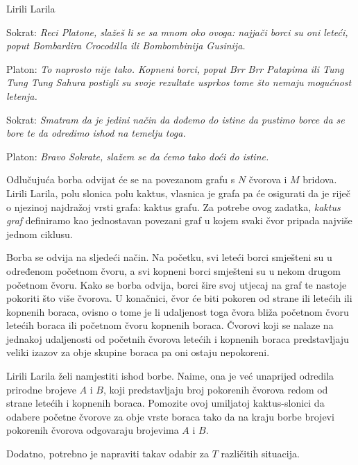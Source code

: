 \begin{statement}[
  problempoints=100,
  timelimit=3 sekunde,
  memorylimit=512 MiB,
]{Lirili Larila}

Sokrat: 
\textit{Reci Platone, slažeš li se sa mnom oko ovoga: 
najjači borci su oni leteći, poput Bombardira Crocodilla ili Bombombinija Gusinija.}

Platon:
\textit{To naprosto nije tako. Kopneni borci, poput Brr Brr Patapima ili Tung Tung Tung Sahura 
postigli su svoje rezultate usprkos tome što nemaju mogućnost letenja. }

Sokrat:
\textit{Smatram da je jedini način da dođemo do istine da pustimo borce da se bore te 
da odredimo ishod na temelju toga. }

Platon: 
\textit{Bravo Sokrate, slažem se da ćemo tako doći do istine. }

Odlučujuća borba odvijat će se na povezanom grafu s $N$ čvorova i $M$ bridova. 
Lirili Larila, polu slonica polu kaktus, vlasnica je grafa pa će osigurati 
da je riječ o njezinoj najdražoj vrsti grafa: kaktus grafu. 
Za potrebe ovog zadatka, \textit{kaktus graf} definiramo kao jednostavan povezani graf 
u kojem svaki čvor pripada najviše jednom ciklusu. 

Borba se odvija na sljedeći način. 
Na početku, svi leteći borci smješteni su u određenom početnom čvoru, a svi kopneni 
borci smješteni su u nekom drugom početnom čvoru. 
Kako se borba odvija, borci šire svoj utjecaj na graf te nastoje pokoriti što više čvorova. 
U konačnici, čvor će biti pokoren od strane ili letećih ili kopnenih boraca, ovisno o tome 
je li udaljenost toga čvora bliža početnom čvoru letećih boraca ili početnom čvoru 
kopnenih boraca. 
Čvorovi koji se nalaze na jednakoj udaljenosti od početnih čvorova letećih i kopnenih boraca 
predstavljaju veliki izazov za obje skupine boraca 
pa oni ostaju nepokoreni.

Lirili Larila želi namjestiti ishod borbe. Naime, ona je već unaprijed 
odredila prirodne brojeve $A$ i $B$, koji predstavljaju broj pokorenih 
čvorova redom od strane letećih i kopnenih boraca. 
Pomozite ovoj umiljatoj kaktus-slonici da odabere početne čvorove za obje vrste boraca 
tako da na kraju borbe brojevi pokorenih čvorova odgovaraju brojevima $A$ i $B$. 

Dodatno, potrebno je napraviti takav odabir za $T$ različitih situacija. 


\end{statement}
